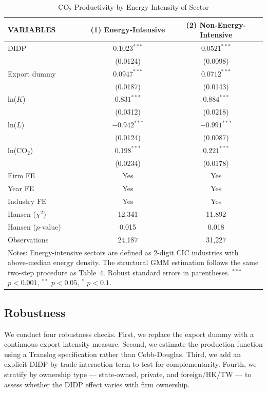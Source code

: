\documentclass[11pt,a4paper]{article}
\begin{document}
\begin{table}[htbp]
\centering
\caption{CO$_2$ Productivity by Energy Intensity of Sector}
\label{tab:energy_intensity}
\begin{tabular}{lcc}
\toprule
VARIABLES & (1) Energy-Intensive & (2) Non-Energy-Intensive \\
\midrule
DIDP            & $0.1023^{***}$ & $0.0521^{***}$ \\
                & (0.0124) & (0.0098) \\
Export dummy    & $0.0947^{***}$ & $0.0712^{***}$ \\
                & (0.0187) & (0.0143) \\
ln($K$)         & $0.831^{***}$ & $0.884^{***}$ \\
                & (0.0312) & (0.0218) \\
ln($L$)         & $-0.942^{***}$ & $-0.991^{***}$ \\
                & (0.0124) & (0.0087) \\
ln(CO$_2$)      & $0.198^{***}$ & $0.221^{***}$ \\
                & (0.0234) & (0.0178) \\
Firm FE         & Yes & Yes \\
Year FE         & Yes & Yes \\
Industry FE     & Yes & Yes \\
Hansen ($\chi^2$) & 12.341 & 11.892 \\
Hansen ($p$-value) & 0.015 & 0.018 \\
Observations    & 24{,}187 & 31{,}227 \\
\bottomrule
\multicolumn{3}{p{0.75\textwidth}}{\footnotesize Notes: Energy-intensive sectors are defined as 2-digit CIC industries with above-median energy density. The structural GMM estimation follows the same two-step procedure as Table~4. Robust standard errors in parentheses. $^{***}$ $p<0.001$, $^{**}$ $p<0.05$, $^{*}$ $p<0.1$.}
\end{tabular}
\end{table}



\subsection{Robustness}

We conduct four robustness checks. First, we replace the export dummy with a continuous export intensity measure. Second, we estimate the production function using a Translog specification rather than Cobb-Douglas. Third, we add an explicit DIDP-by-trade interaction term to test for complementarity. Fourth, we stratify by ownership type --- state-owned, private, and foreign/HK/TW --- to assess whether the DIDP effect varies with firm ownership.
\end{document}
